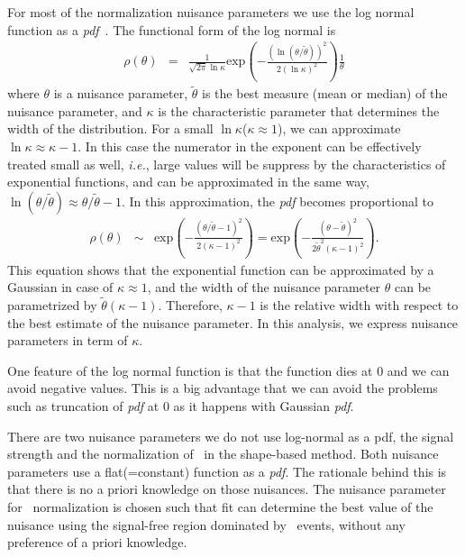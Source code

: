 For most of the normalization nuisance parameters we use the log normal function as a 
\textit{pdf}~\cite{combination_stat}. The functional form of the log normal is 
\begin{eqnarray} 
\rho(\theta) 
&=& 
\frac{1}{\sqrt{2\pi}\ln\kappa}  
\textrm{exp} \left( - \frac{\left( \ln(\theta/\tilde{\theta})\right)^2}
                           {2(\ln\kappa)^2}  \right) 
\frac{1}{\theta}  
\end{eqnarray} 
where $\theta$ is a nuisance parameter, $\tilde{\theta}$ is the best measure 
(mean or median) of the nuisance parameter, and $\kappa$ is the characteristic 
parameter that determines the width of the distribution. 
For a small $\ln\kappa$($\kappa \approx 1$), we can approximate $\ln\kappa \approx \kappa - 1$.
In this case the numerator in the exponent can be effectively treated small as well,
\textit{i.e.}, large values will be suppress by the characteristics of exponential functions,  
and can be approximated in the same way, $\ln (\theta/\tilde{\theta}) \approx \theta/\tilde{\theta} - 1$.
In this approximation, the \textit{pdf} becomes proportional to 
\begin{eqnarray} 
\rho(\theta) 
&\sim&
\textrm{exp} \left( - \frac{\left( \theta/\tilde{\theta} - 1 \right)^2}
                           {2( \kappa - 1)^2}  \right)  
= 
\textrm{exp} \left( - \frac{\left( \theta - \tilde{\theta} \right)^2}
                           {2\tilde{\theta}^2 ( \kappa - 1)^2}  \right).  
\end{eqnarray} 
This equation shows that the exponential function can be 
approximated by a Gaussian in case of $\kappa \approx 1$, and the width 
of the nuisance parameter $\theta$ can be parametrized by $\tilde{\theta}( \kappa - 1)$.
Therefore, $\kappa - 1$ is the relative width with respect to the best 
estimate of the nuisance parameter. In this analysis, we express nuisance parameters 
in term of $\kappa$.

One feature of the log normal function is that the function dies at 0
and we can avoid negative values. This is a big advantage that we can avoid 
the problems such as truncation of \textit{pdf} at 0 as it happens with Gaussian \textit{pdf}.    

There are two nuisance parameters we do not use log-normal as a pdf, 
the signal strength and the normalization of \qqww\ in the shape-based method. 
Both nuisance parameters use a flat(=constant) function as a \textit{pdf}.  
The rationale behind this is that there is no a priori knowledge on those 
nuisances. The nuisance parameter for \qqww\ normalization is chosen 
such that fit can determine the best value of the nuisance using 
the signal-free region dominated by \qqww\ events, without any preference 
of a priori knowledge. 


